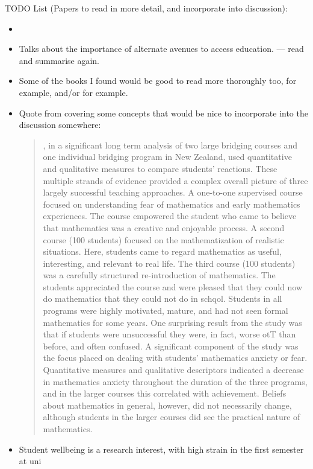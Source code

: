 \documentclass[twoside,12pt,a4paper]{report}
\begin{document}
TODO List (Papers to read in more detail, and incorporate into discussion):
\begin{itemize}
	\item 
	\item \cite{Irwin2018} Talks about the importance of alternate avenues to access education. --- read and summarise again.
	\item Some of the books I found would be good to read more thoroughly too, \cite{Volmink1994} for example, and/or \cite{McGivney1996} for example.
	\item Quote from \cite{Galligan2008} covering some concepts that would be nice to incorporate into the discussion somewhere:
		\begin{quote}
		, in a significant long term analysis of two large bridging
		courses and one individual bridging program in New Zealand, used quantitative
		and qualitative measures to compare students' reactions. These multiple strands of
		evidence provided a complex overall picture of three largely successful teaching
		approaches. A one-to-one supervised course focused on understanding fear of
		mathematics and early mathematics experiences. The course empowered the
		student who came to believe that mathematics was a creative and enjoyable
		process. A second course (100 students) focused on the mathematization of
		realistic situations. Here, students came to regard mathematics as useful,
		interesting, and relevant to real life. The third course (100 students) was a carefully
		structured re-introduction of mathematics. The students appreciated the course and
		were pleased that they could now do mathematics that they could not do in schqol.
		Students in all programs were highly motivated, mature, and had not seen formal
		mathematics for some years. One surprising result from the study was that if
		students were unsuccessful they were, in fact, worse otT than before, and often
		confused. A significant component of the study was the focus placed on dealing
		with students' mathematics anxiety or fear. Quantitative measures and qualitative
		descriptors indicated a decrease in mathematics anxiety throughout the duration of
		the three programs, and in the larger courses this correlated with achievement.
		Beliefs about mathematics in general, however, did not necessarily change,
		although students in the larger courses did see the practical nature of mathematics.
		\end{quote}

	\item Student wellbeing is a research interest, with high strain in the first semester at uni \cite{Bewick2010}
\end{itemize}
\end{document}
